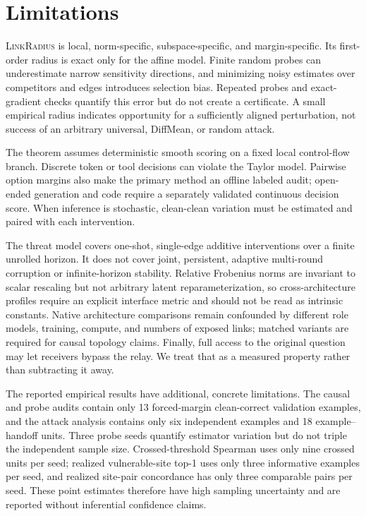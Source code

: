 \documentclass[11pt]{article}
\newcommand{\method}{\textsc{LinkRadius}}
\begin{document}
\section{Limitations}

\method{} is local, norm-specific, subspace-specific, and margin-specific. Its
first-order radius is exact only for the affine model. Finite random probes can
underestimate narrow sensitivity directions, and minimizing noisy estimates
over competitors and edges introduces selection bias. Repeated probes and
exact-gradient checks quantify this error but do not create a certificate. A
small empirical radius indicates opportunity for a sufficiently aligned
perturbation, not success of an arbitrary universal, DiffMean, or random attack.

The theorem assumes deterministic smooth scoring on a fixed local control-flow
branch. Discrete token or tool decisions can violate the Taylor model. Pairwise
option margins also make the primary method an offline labeled audit; open-ended
generation and code require a separately validated continuous decision score.
When inference is stochastic, clean-clean variation must be estimated and
paired with each intervention.

The threat model covers one-shot, single-edge additive interventions over a
finite unrolled horizon. It does not cover joint, persistent, adaptive
multi-round corruption or infinite-horizon stability. Relative Frobenius norms
are invariant to scalar rescaling but not arbitrary latent reparameterization,
so cross-architecture profiles require an explicit interface metric and should
not be read as intrinsic constants. Native architecture comparisons remain
confounded by different role models, training, compute, and numbers of exposed
links; matched variants are required for causal topology claims. Finally, full
access to the original question may let receivers bypass the relay. We treat
that as a measured property rather than subtracting it away.

The reported empirical results have additional, concrete limitations. The
causal and probe audits contain only 13 forced-margin clean-correct validation
examples, and the attack analysis contains only six independent examples and
18 example--handoff units. Three probe seeds quantify estimator variation but
do not triple the independent sample size. Crossed-threshold Spearman uses only
nine crossed units per seed; realized vulnerable-site top-1 uses only three
informative examples per seed, and realized site-pair concordance has only
three comparable pairs per seed. These point estimates therefore have high
sampling uncertainty and are reported without inferential confidence claims.
\end{document}
